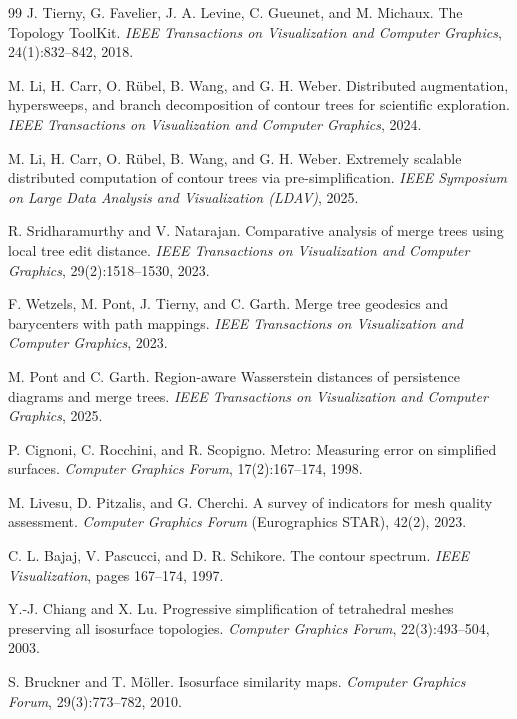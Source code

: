 \documentclass[twocolumn, a4paper, 10pt]{article}
\begin{document}
\begin{thebibliography}{99}
J. Tierny, G. Favelier, J. A. Levine, C. Gueunet, and M. Michaux.
The Topology ToolKit.
\textit{IEEE Transactions on Visualization and Computer Graphics}, 24(1):832--842, 2018.

M. Li, H. Carr, O. R\"ubel, B. Wang, and G. H. Weber.
Distributed augmentation, hypersweeps, and branch decomposition of contour trees for scientific exploration.
\textit{IEEE Transactions on Visualization and Computer Graphics}, 2024.

M. Li, H. Carr, O. R\"ubel, B. Wang, and G. H. Weber.
Extremely scalable distributed computation of contour trees via pre-simplification.
\textit{IEEE Symposium on Large Data Analysis and Visualization (LDAV)}, 2025.

R. Sridharamurthy and V. Natarajan.
Comparative analysis of merge trees using local tree edit distance.
\textit{IEEE Transactions on Visualization and Computer Graphics}, 29(2):1518--1530, 2023.

F. Wetzels, M. Pont, J. Tierny, and C. Garth.
Merge tree geodesics and barycenters with path mappings.
\textit{IEEE Transactions on Visualization and Computer Graphics}, 2023.

M. Pont and C. Garth.
Region-aware Wasserstein distances of persistence diagrams and merge trees.
\textit{IEEE Transactions on Visualization and Computer Graphics}, 2025.


P. Cignoni, C. Rocchini, and R. Scopigno.
Metro: Measuring error on simplified surfaces.
\textit{Computer Graphics Forum}, 17(2):167--174, 1998.

M. Livesu, D. Pitzalis, and G. Cherchi.
A survey of indicators for mesh quality assessment.
\textit{Computer Graphics Forum} (Eurographics STAR), 42(2), 2023.

C. L. Bajaj, V. Pascucci, and D. R. Schikore.
The contour spectrum.
\textit{IEEE Visualization}, pages 167--174, 1997.

Y.-J. Chiang and X. Lu.
Progressive simplification of tetrahedral meshes preserving all isosurface topologies.
\textit{Computer Graphics Forum}, 22(3):493--504, 2003.

S. Bruckner and T. M\"oller.
Isosurface similarity maps.
\textit{Computer Graphics Forum}, 29(3):773--782, 2010.


\end{thebibliography}
\end{document}
